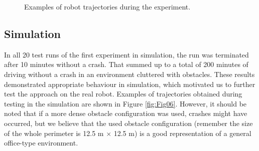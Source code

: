 \begin{figure}

\caption{Examples of robot trajectories during the experiment. }
\label{Fig:LabellingTraj}
\end{figure}

\subsection{Simulation}

In all 20 test runs of the first experiment in simulation, the run was terminated after 10 minutes without a crash. That summed up to a total of 200 minutes of driving without a crash in an environment cluttered with obstacles. These results demonstrated appropriate behaviour in simulation, which motivated us to further test the approach on the real robot. Examples of trajectories obtained during testing in the simulation are shown in Figure \ref{fig:Fig06}. However, it should be noted that if a more dense obstacle configuration was used, crashes might have occurred, but we believe that the used obstacle configuration (remember the size of the whole perimeter is 12.5 m $\times$ 12.5 m) is a good representation of a general office-type environment.

